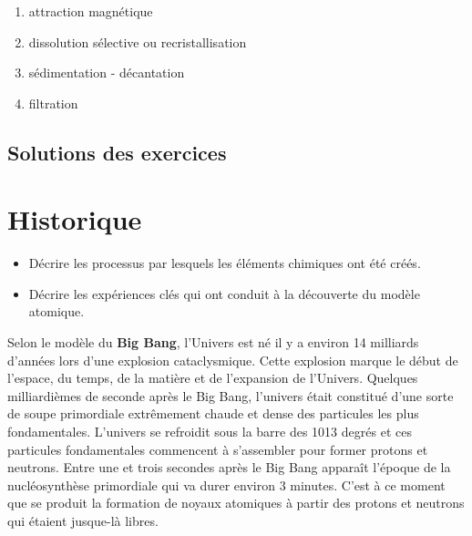 \documentclass[
  11pt,
  a4paper,
  openany]{book}
\providecommand{\tightlist}{%
  \setlength{\itemsep}{0pt}\setlength{\parskip}{0pt}}
\begin{document}
\begin{Answer}

\begin{enumerate}
\def\labelenumi{\arabic{enumi}.}
\tightlist
\item
  attraction magnétique
\item
  dissolution sélective ou recristallisation
\item
  sédimentation - décantation
\item
  filtration
\end{enumerate}

\end{Answer}

\newpage

\section{Solutions des exercices} \shipoutAnswer

\hypertarget{historique}{%
\chapter{Historique}\label{historique}}

\begin{objectives}

\begin{itemize}
\tightlist
\item
  Décrire les processus par lesquels les éléments chimiques ont été créés.
\item
  Décrire les expériences clés qui ont conduit à la découverte du modèle atomique.
\end{itemize}

\end{objectives}

Selon le modèle du \textbf{Big Bang}, l'Univers est né il y a environ 14 milliards d'années lors d'une explosion cataclysmique. Cette explosion marque le début de l'espace, du temps, de la matière et de l'expansion de l'Univers. Quelques milliardièmes de seconde après le Big Bang, l'univers était constitué d'une sorte de soupe primordiale extrêmement chaude et dense des particules les plus fondamentales. L'univers se refroidit sous la barre des 1013 degrés et ces particules fondamentales commencent à s'assembler pour former protons et neutrons. Entre une et trois secondes après le Big Bang apparaît l'époque de la nucléosynthèse primordiale qui va durer environ 3 minutes. C'est à ce moment que se produit la formation de noyaux atomiques à partir des protons et neutrons qui étaient jusque-là libres.
\end{document}

